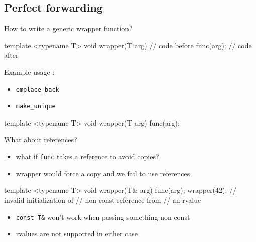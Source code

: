\subsection[forward]{Perfect forwarding}

\begin{frame}[fragile]
  How to write a generic wrapper function?
  \begin{block}{}
    \begin{cppcode*}{}
      template <typename T>
      void wrapper(T arg) {
        // code before
        func(arg);
        // code after
      }
    \end{cppcode*}
  \end{block}
  Example usage :
  \begin{itemize}
  \item \texttt{emplace_back}
  \item \texttt{make_unique}
  \end{itemize}
\end{frame}

\begin{frame}[fragile]
  \begin{block}{}
    \begin{cppcode*}{}
      template <typename T>
      void wrapper(T arg) {
        func(arg);
      }
    \end{cppcode*}
  \end{block}
  \begin{alertblock}{What about references?}
    \begin{itemize}
      \item what if \texttt{func} takes a reference to avoid copies?
      \item wrapper would force a copy and we fail to use references
    \end{itemize}

  \end{alertblock}
\end{frame}

\begin{frame}[fragile]
  \begin{block}{}
    \begin{cppcode*}{}
      template <typename T>
      void wrapper(T& arg) {
        func(arg);
      }
      wrapper(42);
      // invalid initialization of
      // non-const reference from
      // an rvalue
    \end{cppcode*}
  \end{block}
  \begin{alertblock}{}
    \begin{itemize}
      \item \texttt{const T&} won't work when passing something non const
      \item rvalues are not supported in either case
    \end{itemize}
  \end{alertblock}
\end{frame}

